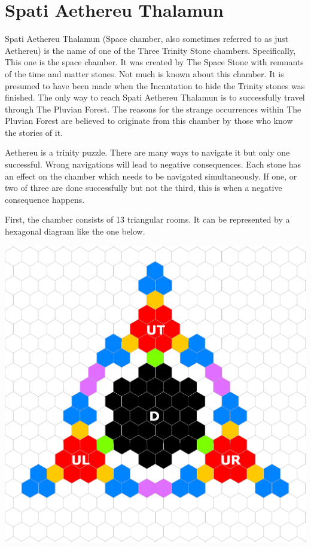 \section{Spati Aethereu Thalamun}

Spati Aethereu Thalamun (Space chamber, also sometimes referred to as just Aethereu) is the name of one of the Three Trinity Stone chambers. Specifically, This one is the space chamber. It was created by The Space Stone with remnants of the time and matter stones. Not much is known about this chamber. It is presumed to have been made when the Incantation to hide the Trinity stones was finished. The only way to reach Spati Aethereu Thalamun is to successfully travel through The Pluvian Forest. The reasons for the strange occurrences within The Pluvian Forest are believed to originate from this chamber by those who know the stories of it.

Aethereu is a trinity puzzle. There are many ways to navigate it but only one successful. Wrong navigations will lead to negative consequences. Each stone has an effect on the chamber which needs to be navigated simultaneously. If one, or two of three are done successfully but not the third, this is when a negative consequence happens.

First, the chamber consists of 13 triangular rooms. It can be represented by a hexagonal diagram like the one below.

\begin{center}
	\includegraphics[width=\linewidth]{img/Aethereu/U.png}
\end{center}

